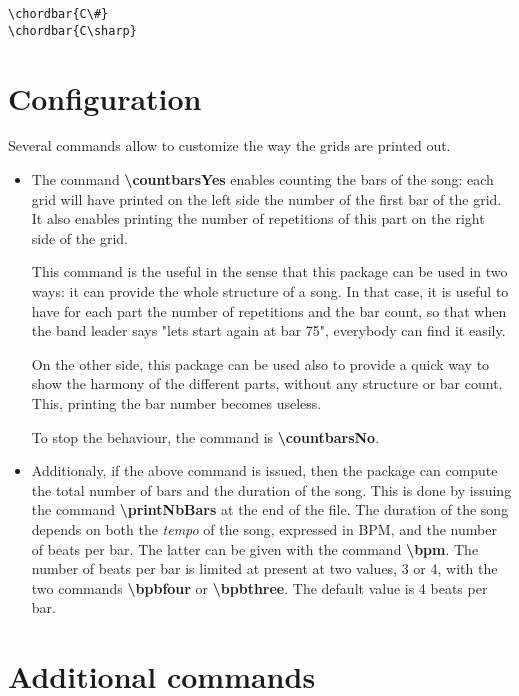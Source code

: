 \documentclass[11pt]{article}
\newcommand{\btt}{\bfseries \ttfamily }
\newcommand{\tbs}{\textbackslash{}}
\begin{document}
\begin{lstlisting}
\chordbar{C\#}
\chordbar{C\sharp}
\end{lstlisting}





\section{Configuration}

Several commands allow to customize the way the grids are printed out.

\begin{itemize}
\item The command {\btt \tbs countbarsYes} enables counting the bars of the song:
each grid will have printed on the left side the number of the first bar of the grid.
It also enables printing the number of repetitions of this part on the right side of the grid.

This command is the useful in the sense that this package can be used in two ways:
it can provide the whole structure of a song.
In that case, it is useful to have for each part the number of repetitions and the bar count, so that when the band leader says "lets start again at bar 75", everybody can find it easily.

On the other side, this package can be used also to provide a quick way to show the harmony of the different parts, without any structure or bar count.
This, printing the bar number becomes useless.

To stop the behaviour, the command is {\btt \tbs countbarsNo}.

\item Additionaly, if the above command is issued, then the package can compute the total number of bars and the duration of the song.
This is done by issuing the command {\btt \tbs printNbBars} at the end of the file.
The duration of the song depends on both the {\em tempo} of the song, expressed in BPM, and the number of beats per bar.
The latter can be given with the command {\btt \tbs bpm}.
The number of beats per bar is limited at present at two values, 3 or 4, with the two commands
{\btt \tbs bpbfour} or {\btt \tbs bpbthree}.
The default value is 4 beats per bar.


\end{itemize}

\section{Additional commands}
\end{document}
